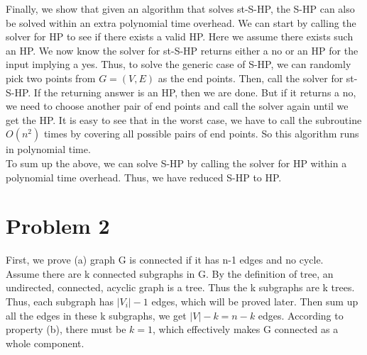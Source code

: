 \documentclass[titlepage, paper=a4, fontsize=11pt]{scrartcl} %
\numberwithin{equation}{section} %
\numberwithin{figure}{section} %
\numberwithin{table}{section} %
\numberwithin{figure}{section}
\begin{document}
Finally, we show that given an algorithm that solves st-S-HP, the S-HP can also be solved within an extra polynomial time overhead. We can start by calling the solver for HP to see if there exists a valid HP. Here we assume there exists such an HP. We now know the solver for st-S-HP returns either a no or an HP for the input implying a yes. Thus, to solve the generic case of S-HP, we can randomly pick two points from $G=(V,E)$ as the end points. Then, call the solver for st-S-HP. If the returning answer is an HP, then we are done. But if it returns a no, we need to choose another pair of end points and call the solver again until we get the HP. It is easy to see that in the worst case, we have to call the subroutine $O(n^2)$ times by covering all possible pairs of end points. So this algorithm runs in polynomial time. \\

To sum up the above, we can solve S-HP by calling the solver for HP within a polynomial time overhead. Thus, we have reduced S-HP to HP.




\section*{Problem 2}
First, we prove (a) graph G is connected if it has n-1 edges and no cycle. \\
Assume there are k connected subgraphs in G. By the definition of tree, an undirected, connected, acyclic graph is a tree. Thus the k subgraphs are k trees. Thus, each subgraph has $|V_i|-1$ edges, which will be proved later. Then sum up all the edges in these k subgraphs, we get $|V|-k = n-k$ edges. According to property (b), there must be $k=1$, which effectively makes G connected as a whole component. \\
\end{document}
